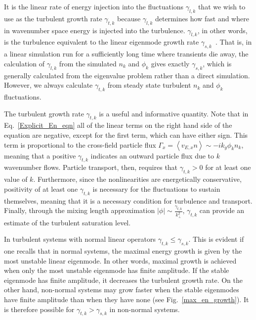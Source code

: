 \documentclass[twocolumn,showkeys,superscriptaddress]{revtex4}
\begin{document}
It is the linear rate of energy injection into the fluctuations
$\gamma_{l,k}$ that we wish to use as the turbulent growth rate
$\gamma_{t,k}$ because $\gamma_{l,k}$ determines how fast and where in wavenumber space energy is injected into the turbulence.
$\gamma_{l,k}$, in other words, is the turbulence equivalent to the linear eigenmode growth rate $\gamma_{s,k}$~\cite{friedman2012b,terry2006b}. 
That is, in a linear simulation run for a sufficiently long time where transients die away, the calculation of $\gamma_{l,k}$ from the simulated $n_k$ and $\phi_k$ gives exactly $\gamma_{s,k}$, which is generally
calculated from the eigenvalue problem rather than a direct simulation.
However, we always calculate $\gamma_{t,k}$ from steady state turbulent $n_k$ and $\phi_k$ fluctuations.

The turbulent growth rate $\gamma_{t,k}$ is a useful and informative quantity. 
Note that in Eq.~\ref{Explicit_En_eqn} all of the linear terms on the right hand side of the equation are negative, except for the first term, which can have either sign. 
This term is proportional to the cross-field particle flux $\Gamma_x = \left< v_{E,x} n \right> \sim -i k_y \phi_k n_k$, meaning that a positive $\gamma_{t,k}$ indicates an outward particle flux
due to $k$ wavenumber flows. Particle transport, then, requires that $\gamma_{t,k} > 0$ for at least one value of $k$. Furthermore, since the nonlinearities are energetically conservative,
positivity of at least one $\gamma_{t,k}$ is necessary for the fluctuations to sustain themselves, meaning that it is a necessary condition for turbulence and transport. 
Finally, through the mixing length approximation $|\phi| \sim \frac{\gamma_{t,k}}{k_\perp^2}$, $\gamma_{t,k}$ can provide an estimate of the turbulent saturation level.

In turbulent systems with normal linear operators $\gamma_{t,k} \le \gamma_{s,k}$. This is evident if one recalls that in normal systems, the maximal
energy growth is given by the most unstable linear eigenmode. In other words, maximal growth is achieved when only the most unstable eigenmode has finite amplitude.
If the stable eigenmode has finite amplitude, it decreases the turbulent growth rate.
On the other hand, non-normal systems may grow faster when the stable eigenmodes have finite amplitude than when they have none (see Fig.~\ref{max_en_growth}). 
It is therefore possible for $\gamma_{t,k} > \gamma_{s,k}$ in non-normal systems.
\end{document}
